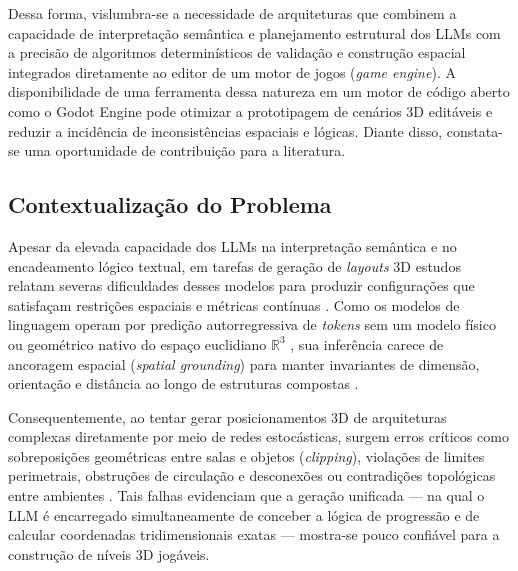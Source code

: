 Dessa forma, vislumbra-se a necessidade de arquiteturas que combinem a capacidade de interpretação semântica e planejamento estrutural dos LLMs com a precisão de algoritmos determinísticos de validação e construção espacial integrados diretamente ao editor de um motor de jogos (\textit{game engine}). A disponibilidade de uma ferramenta dessa natureza em um motor de código aberto como o Godot Engine pode otimizar a prototipagem de cenários 3D editáveis e reduzir a incidência de inconsistências espaciais e lógicas. Diante disso, constata-se uma oportunidade de contribuição para a literatura.

\subsection{Contextualização do Problema}
\label{sec:contextualizacao_problema}

Apesar da elevada capacidade dos LLMs na interpretação semântica e no encadeamento lógico textual, em tarefas de geração de \textit{layouts} 3D estudos relatam severas dificuldades desses modelos para produzir configurações que satisfaçam restrições espaciais e métricas contínuas \cite{Gallotta_2024, sun2024roomplanner, feng2026repurposing3dgenerativemodel}. Como os modelos de linguagem operam por predição autorregressiva de \textit{tokens} sem um modelo físico ou geométrico nativo do espaço euclidiano $\mathbb{R}^3$ \cite{Gallotta_2024, feng2026repurposing3dgenerativemodel}, sua inferência carece de ancoragem espacial (\textit{spatial grounding}) \cite{harnad1990symbol, sun2024roomplanner} para manter invariantes de dimensão, orientação e distância ao longo de estruturas compostas \cite{cohn2008qualitative}.

Consequentemente, ao tentar gerar posicionamentos 3D de arquiteturas complexas diretamente por meio de redes estocásticas, surgem erros críticos como sobreposições geométricas entre salas e objetos (\textit{clipping}), violações de limites perimetrais, obstruções de circulação e desconexões ou contradições topológicas entre ambientes \cite{xu2025constraint, sun2024roomplanner, feng2026repurposing3dgenerativemodel}. Tais falhas evidenciam que a geração unificada --- na qual o LLM é encarregado simultaneamente de conceber a lógica de progressão e de calcular coordenadas tridimensionais exatas --- mostra-se pouco confiável para a construção de níveis 3D jogáveis.

